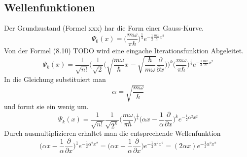 \begin{refsection}
\subsection{Wellenfunktionen}
Der Grundzustand (Formel xxx) har die Form einer Gauss-Kurve.
\begin{equation}
\Psi_0(x)
=
\biggl(\frac{m\omega}{\pi\hbar}\biggr)^\frac14
e^{-\frac12\frac{m\omega}{\hbar}x^2}
\end{equation}
Von der Formel (8.10) TODO wird eine eingache Iterationsfunktion Abgeleitet.
\begin{equation}
\Psi_k(x)
=
\frac1{\sqrt{n!}}\biggl(\frac1{\sqrt{2}}
\biggl(\sqrt{\frac{m\omega}{\hbar}x}-
\sqrt{\frac{\hbar}{m\omega}}\frac{\partial}{\partial x}\biggr)\biggr)^k
\biggl(\frac{m\omega}{\pi\hbar}\biggr)^\frac14
e^{-\frac12\frac{m\omega}{\hbar}x^2}
\end{equation}
In die Gleichung substituiert man
\[
\alpha=\sqrt{\frac{m\omega}\hbar}
\]
und formt sie ein wenig um.
\begin{equation}
\Psi_k(x)
=
\frac1{\sqrt{n!}}\frac1{\sqrt{2^k}}
\biggl(\frac{m\omega}{\pi\hbar}\biggr)^\frac14
\biggl(\alpha x-\frac1{\alpha}\frac{\partial}{\partial x}\biggr)^k
e^{-\frac12\alpha^2x^2}
\end{equation}
Durch ausmultiplizieren erhaltet man die entsprechende Wellenfunktion
\begin{equation}
\biggl(\alpha x-\frac1{\alpha}\frac{\partial}{\partial x}\biggr)^1
e^{-\frac12\alpha^2x^2}
=
\biggl(\alpha x-\frac1{\alpha}\frac{\partial}{\partial x}\biggr)
e^{-\frac12\alpha^2x^2}
=
(2\alpha x)e^{-\frac12\alpha^2x^2}
\end{equation}


\end{refsection}
